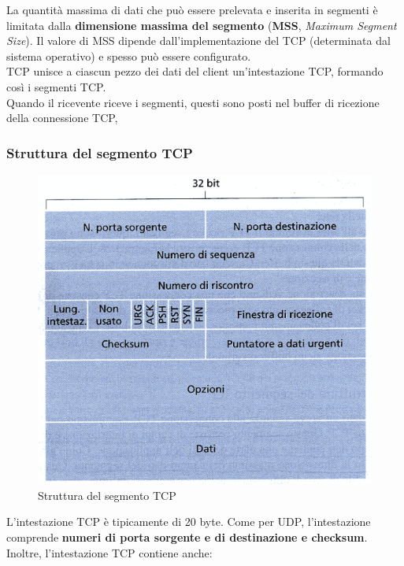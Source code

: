 \documentclass[11pt,a4paper]{article}
\begin{document}
La quantità massima di dati che può essere prelevata e inserita in segmenti è limitata dalla \textbf{dimensione massima del segmento} (\textbf{MSS}, \textit{Maximum Segment Size}). Il valore di MSS dipende dall'implementazione del TCP (determinata dal sistema operativo) e spesso può essere configurato. \\
TCP unisce a ciascun pezzo dei dati del client un'intestazione TCP, formando così i segmenti TCP. \\
Quando il ricevente riceve i segmenti, questi sono posti nel buffer di ricezione della connessione TCP,
\subsubsection{Struttura del segmento TCP}
\begin{figure}
	\begin{center}
		\includegraphics[scale=0.6]{img/031.png}
		\caption{Struttura del segmento TCP}
	\end{center}
\end{figure}
L'intestazione TCP è tipicamente di 20 byte. Come per UDP, l'intestazione comprende \textbf{numeri di porta sorgente e di destinazione e checksum}. Inoltre, l'intestazione TCP contiene anche:
\end{document}
